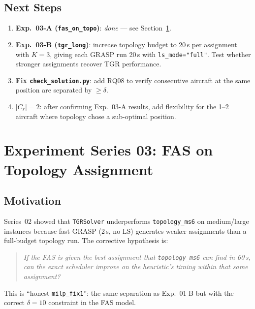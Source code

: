 \subsection{Next Steps}
\label{exp:exp02-next}

\begin{enumerate}[noitemsep]
    \item \textbf{Exp.~03-A (\texttt{fas\_on\_topo})}: \emph{done} — see
          Section~\ref{sec:exp03}.
    \item \textbf{Exp.~03-B (\texttt{tgr\_long})}: increase topology budget to 20\,s per
          assignment with $K=3$, giving each GRASP run 20\,s with \texttt{ls\_mode="full"}.
          Test whether stronger assignments recover TGR performance.
    \item \textbf{Fix \texttt{check\_solution.py}}: add RQ08 to verify
          consecutive aircraft at the same position are separated by $\geq\delta$.
    \item \textbf{$|C_r|=2$}: after confirming Exp.~03-A results, add flexibility
          for the 1--2 aircraft where topology chose a sub-optimal position.
\end{enumerate}

\newpage
\section{Experiment Series 03: FAS on Topology Assignment}
\label{sec:exp03}

\subsection{Motivation}

Series~02 showed that \texttt{TGRSolver} underperforms \texttt{topology\_ms6}
on medium/large instances because fast GRASP (2\,s, no LS) generates weaker
assignments than a full-budget topology run.  The corrective hypothesis is:

\begin{quote}
\emph{If the FAS is given the best assignment that \texttt{topology\_ms6} can
find in 60\,s, can the exact scheduler improve on the heuristic's timing
within that same assignment?}
\end{quote}

This is ``honest \texttt{milp\_fix1}'': the same separation as Exp.~01-B but
with the correct $\delta=10$ constraint in the FAS model.


